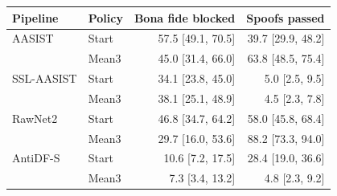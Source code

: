 \begin{tabular}{@{}llrr@{}}
\toprule
Pipeline & Policy & Bona fide blocked & Spoofs passed \\
\midrule
AASIST & Start & 57.5 [49.1, 70.5] & 39.7 [29.9, 48.2] \\
 & Mean3 & 45.0 [31.4, 66.0] & 63.8 [48.5, 75.4] \\
SSL-AASIST & Start & 34.1 [23.8, 45.0] & 5.0 [2.5, 9.5] \\
 & Mean3 & 38.1 [25.1, 48.9] & 4.5 [2.3, 7.8] \\
RawNet2 & Start & 46.8 [34.7, 64.2] & 58.0 [45.8, 68.4] \\
 & Mean3 & 29.7 [16.0, 53.6] & 88.2 [73.3, 94.0] \\
AntiDF-S & Start & 10.6 [7.2, 17.5] & 28.4 [19.0, 36.6] \\
 & Mean3 & 7.3 [3.4, 13.2] & 4.8 [2.3, 9.2] \\
\bottomrule
\end{tabular}
